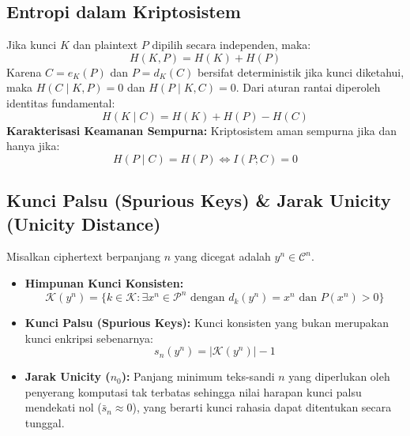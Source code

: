 \documentclass[11pt,a4paper]{article}
\begin{document}
\subsection{Entropi dalam Kriptosistem}
Jika kunci $K$ dan plaintext $P$ dipilih secara independen, maka:
\[
H(K, P) = H(K) + H(P)
\]
Karena $C = e_K(P)$ dan $P = d_K(C)$ bersifat deterministik jika kunci diketahui, maka $H(C \mid K, P) = 0$ dan $H(P \mid K, C) = 0$. Dari aturan rantai diperoleh identitas fundamental:
\[
H(K \mid C) = H(K) + H(P) - H(C)
\]
\textbf{Karakterisasi Keamanan Sempurna:} Kriptosistem aman sempurna jika dan hanya jika:
\[
H(P \mid C) = H(P) \iff I(P; C) = 0
\]

\subsection{Kunci Palsu (Spurious Keys) \& Jarak Unicity (Unicity Distance)}
Misalkan ciphertext berpanjang $n$ yang dicegat adalah $y^n \in \mathcal{C}^n$.
\begin{itemize}[leftmargin=*]
    \item \textbf{Himpunan Kunci Konsisten:}
    \[
    \mathcal{K}(y^n) = \{k \in \mathcal{K} : \exists x^n \in \mathcal{P}^n \text{ dengan } d_k(y^n) = x^n \text{ dan } P(x^n) > 0\}
    \]
    \item \textbf{Kunci Palsu (Spurious Keys):} Kunci konsisten yang bukan merupakan kunci enkripsi sebenarnya:
    \[
    s_n(y^n) = |\mathcal{K}(y^n)| - 1
    \]
    \item \textbf{Jarak Unicity ($n_0$):} Panjang minimum teks-sandi $n$ yang diperlukan oleh penyerang komputasi tak terbatas sehingga nilai harapan kunci palsu mendekati nol ($\bar{s}_n \approx 0$), yang berarti kunci rahasia dapat ditentukan secara tunggal.
\end{itemize}
\end{document}
